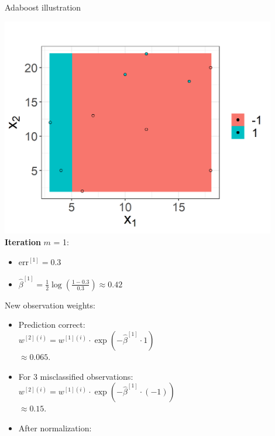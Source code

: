 \begin{vbframe}{Adaboost illustration}
\begin{footnotesize}
\begin{minipage}[b]{0.45\textwidth}
  \includegraphics[width=0.9\textwidth]{figure/adaboost_viz_mlr3_1.png}\\
  \textbf{Iteration} $m$ = 1:
  \begin{itemize}
    \item $\text{err}^{[1]} = 0.3$
    \item $\hat{\beta}^{[1]} = \frac{1}{2} \log \left( \frac{1 - 0.3}{0.3} 
    \right) \approx 0.42$
  \end{itemize}
\end{minipage}%
\begin{minipage}[b]{0.55\textwidth}
  New observation weights:
  \begin{itemize}
    \item Prediction correct: \\
      $w^{[2](i)} = w^{[1](i)} \cdot \exp \left(-\hat \beta^{[1]} \cdot 1 
      \right)$\\ $\approx 0.065.$
    \item For 3 misclassified observations: \\
      $w^{[2](i)} = w^{[1](i)} \cdot \exp \left(-\hat \beta^{[1]} \cdot (-1) 
      \right)$\\ $\approx 0.15.$
    \item After normalization: 
    \begin{itemize}
    \end{itemize}
\end{itemize}
\end{minipage}


\end{footnotesize}
\end{vbframe}
